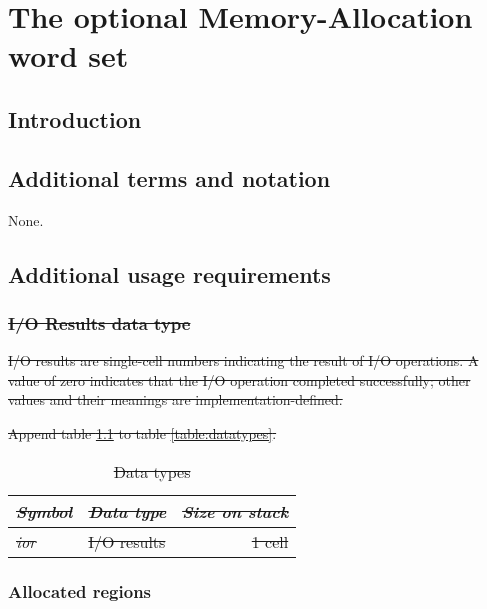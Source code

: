 \chapter{The optional Memory-Allocation word set} %

\section{Introduction} %

\section{Additional terms and notation} %
None.

\section{Additional usage requirements} %

\cbstart{}
\subsection[I/O Results data type]{\sout{I/O Results data type}} %
\label{mem:ior}

\sout{%
I/O results are single-cell numbers indicating the result of I/O
operations. A value of zero indicates that the I/O operation
completed successfully; other values and their meanings are
implementation-defined.}

\sout{Append table \ref{mem:types} to table \ref{table:datatypes}.}

\begin{table}[h]
  \begin{center}
	\caption{\sout{Data types}}
	\label{mem:types}
	\begin{tabular}{llr}
	\hline\hline
	\sout{\emph{Symbol}}	& \sout{\emph{Data type}}	& \sout{\emph{Size on stack}} \\
	\hline
	\sout{\emph{ior}}		& \sout{I/O results}			& \sout{1 cell} \\
	\hline\hline
	\end{tabular}
  \end{center}
\end{table}
\cbend

\subsection{Allocated regions} %

